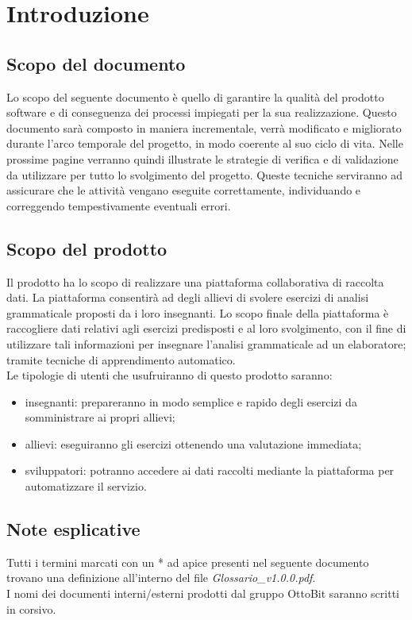 \section{Introduzione}
\subsection{Scopo del documento}
Lo scopo del seguente documento è quello di garantire la qualità del prodotto software e di conseguenza dei processi impiegati per la sua realizzazione. Questo documento sarà composto in maniera incrementale, verrà modificato e migliorato durante l'arco temporale del progetto, in modo coerente al suo ciclo di vita. Nelle prossime pagine verranno quindi illustrate le strategie di verifica e di validazione da utilizzare per tutto lo svolgimento del progetto. Queste tecniche serviranno ad assicurare che le attività vengano eseguite correttamente, individuando e correggendo tempestivamente eventuali errori.
\subsection{Scopo del prodotto}
Il prodotto ha lo scopo di realizzare una piattaforma collaborativa di raccolta dati.  La piattaforma consentirà ad degli allievi di svolere esercizi di analisi grammaticale proposti da i loro insegnanti.
Lo scopo finale della piattaforma è raccogliere dati relativi agli esercizi predisposti e al loro svolgimento, con il fine di utilizzare tali informazioni per insegnare l'analisi grammaticale ad un elaboratore; tramite tecniche di apprendimento automatico.\\
Le tipologie di utenti che usufruiranno di questo prodotto saranno:
\begin{itemize}
	\item insegnanti: prepareranno in modo semplice e rapido degli esercizi da somministrare ai propri allievi;
	\item allievi: eseguiranno gli esercizi ottenendo una valutazione immediata;
	\item sviluppatori: potranno accedere ai dati raccolti mediante la piattaforma per automatizzare il servizio.
\end{itemize}
\subsection{Note esplicative}
Tutti i termini marcati con un * ad apice presenti nel seguente documento trovano una definizione all'interno del file \textit{Glossario\_v1.0.0.pdf}.\\
I nomi dei documenti interni/esterni prodotti dal gruppo OttoBit saranno scritti in corsivo.
